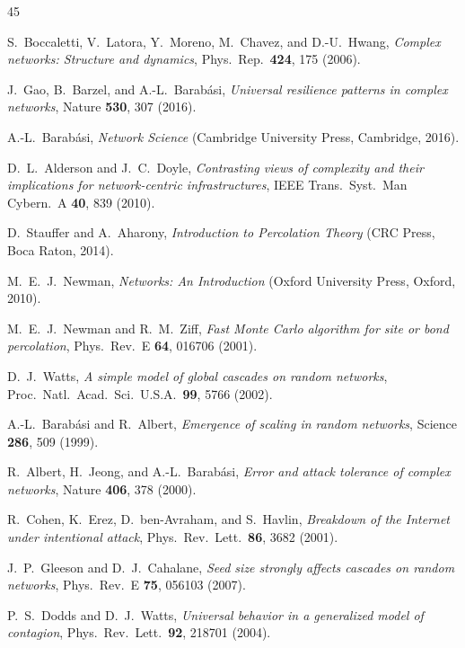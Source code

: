 \documentclass[aps,pre,twocolumn,superscriptaddress,showpacs]{revtex4-2}
\begin{document}
\begin{thebibliography}{45}

S.~Boccaletti, V.~Latora, Y.~Moreno, M.~Chavez, and D.-U.~Hwang,
\emph{Complex networks: Structure and dynamics},
Phys.\ Rep.\ \textbf{424}, 175 (2006).

J.~Gao, B.~Barzel, and A.-L.~Barab\'asi,
\emph{Universal resilience patterns in complex networks},
Nature \textbf{530}, 307 (2016).

A.-L.~Barab\'asi,
\emph{Network Science} (Cambridge University Press, Cambridge, 2016).

D.~L.~Alderson and J.~C.~Doyle,
\emph{Contrasting views of complexity and their implications for network-centric infrastructures},
IEEE Trans.\ Syst.\ Man Cybern.\ A \textbf{40}, 839 (2010).

D.~Stauffer and A.~Aharony,
\emph{Introduction to Percolation Theory} (CRC Press, Boca Raton, 2014).

M.~E.~J.~Newman,
\emph{Networks: An Introduction} (Oxford University Press, Oxford, 2010).

M.~E.~J.~Newman and R.~M.~Ziff,
\emph{Fast Monte Carlo algorithm for site or bond percolation},
Phys.\ Rev.\ E \textbf{64}, 016706 (2001).

D.~J.~Watts,
\emph{A simple model of global cascades on random networks},
Proc.\ Natl.\ Acad.\ Sci.\ U.S.A.\ \textbf{99}, 5766 (2002).

A.-L.~Barab\'asi and R.~Albert,
\emph{Emergence of scaling in random networks},
Science \textbf{286}, 509 (1999).

R.~Albert, H.~Jeong, and A.-L.~Barab\'asi,
\emph{Error and attack tolerance of complex networks},
Nature \textbf{406}, 378 (2000).

R.~Cohen, K.~Erez, D.~ben-Avraham, and S.~Havlin,
\emph{Breakdown of the Internet under intentional attack},
Phys.\ Rev.\ Lett.\ \textbf{86}, 3682 (2001).

J.~P.~Gleeson and D.~J.~Cahalane,
\emph{Seed size strongly affects cascades on random networks},
Phys.\ Rev.\ E \textbf{75}, 056103 (2007).

P.~S.~Dodds and D.~J.~Watts,
\emph{Universal behavior in a generalized model of contagion},
Phys.\ Rev.\ Lett.\ \textbf{92}, 218701 (2004).


\end{thebibliography}
\end{document}
